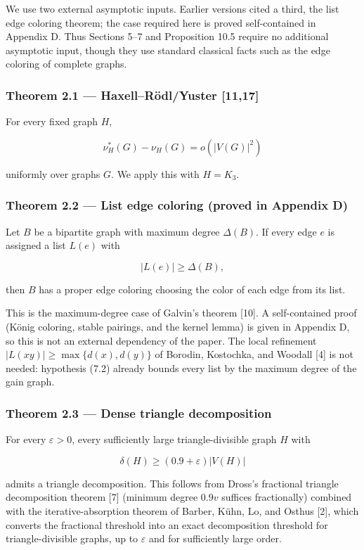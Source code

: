 \documentclass[
  11pt,
]{article}
\begin{document}
We use two external asymptotic inputs. Earlier versions cited a third,
the list edge coloring theorem; the case required here is proved
self-contained in Appendix D. Thus Sections 5--7 and Proposition 10.5
require no additional asymptotic input, though they use standard
classical facts such as the edge coloring of complete graphs.

\subsubsection{Theorem 2.1 --- Haxell--Rödl/Yuster
{[}11,17{]}}\label{theorem-2.1-haxellruxf6dlyuster-1117}

For every fixed graph \(H\),

\[
\nu_H^*(G)-\nu_H(G)=o(|V(G)|^2)
\]

uniformly over graphs \(G\). We apply this with \(H=K_3\).

\subsubsection{Theorem 2.2 --- List edge coloring (proved in Appendix
D)}\label{theorem-2.2-list-edge-coloring-proved-in-appendix-d}

Let \(B\) be a bipartite graph with maximum degree \(\Delta(B)\). If
every edge \(e\) is assigned a list \(L(e)\) with

\[
|L(e)|\ge\Delta(B),
\]

then \(B\) has a proper edge coloring choosing the color of each edge
from its list.

This is the maximum-degree case of Galvin's theorem {[}10{]}. A
self-contained proof (König coloring, stable pairings, and the kernel
lemma) is given in Appendix D, so this is not an external dependency of
the paper. The local refinement \(|L(xy)|\ge\max\{d(x),d(y)\}\) of
Borodin, Kostochka, and Woodall {[}4{]} is not needed: hypothesis (7.2)
already bounds every list by the maximum degree of the gain graph.

\subsubsection{Theorem 2.3 --- Dense triangle
decomposition}\label{theorem-2.3-dense-triangle-decomposition}

For every \(\varepsilon>0\), every sufficiently large triangle-divisible
graph \(H\) with

\[
\delta(H)\ge(0.9+\varepsilon)|V(H)|
\]

admits a triangle decomposition. This follows from Dross's fractional
triangle decomposition theorem {[}7{]} (minimum degree \(0.9v\) suffices
fractionally) combined with the iterative-absorption theorem of Barber,
Kühn, Lo, and Osthus {[}2{]}, which converts the fractional threshold
into an exact decomposition threshold for triangle-divisible graphs, up
to \(\varepsilon\) and for sufficiently large order.
\end{document}
